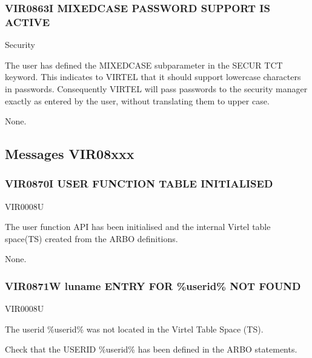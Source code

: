 \documentclass[letterpaper,10pt,english]{sphinxmanual}
\begin{document}
\subsubsection{VIR0863I MIXED\sphinxhyphen{}CASE PASSWORD SUPPORT IS ACTIVE}
\label{\detokenize{messages:vir0863i-mixed-case-password-support-is-active}}\begin{description}
\sphinxAtStartPar
Security

\sphinxAtStartPar
The user has defined the MIXEDCASE subparameter in the SECUR TCT keyword. This indicates to VIRTEL that it should support lower\sphinxhyphen{}case characters in passwords. Consequently VIRTEL will pass passwords to the security manager exactly as entered by the user, without translating them to upper case.

\sphinxAtStartPar
None.

\end{description}


\subsection{Messages VIR08xxx}
\label{\detokenize{messages:id6}}

\subsubsection{VIR0870I USER FUNCTION TABLE INITIALISED}
\label{\detokenize{messages:vir0870i-user-function-table-initialised}}\begin{description}
\sphinxAtStartPar
VIR0008U

\sphinxAtStartPar
The user function API has been initialised and the internal Virtel table space(TS) created from the ARBO definitions.

\sphinxAtStartPar
None.

\end{description}


\subsubsection{VIR0871W luname ENTRY FOR \%userid\% NOT FOUND}
\label{\detokenize{messages:vir0871w-luname-entry-for-userid-not-found}}\begin{description}
\sphinxAtStartPar
VIR0008U

\sphinxAtStartPar
The userid \%userid\% was not located in the Virtel Table Space (TS).

\sphinxAtStartPar
Check that the USERID \%userid\% has been defined in the ARBO statements.

\end{description}
\end{document}
